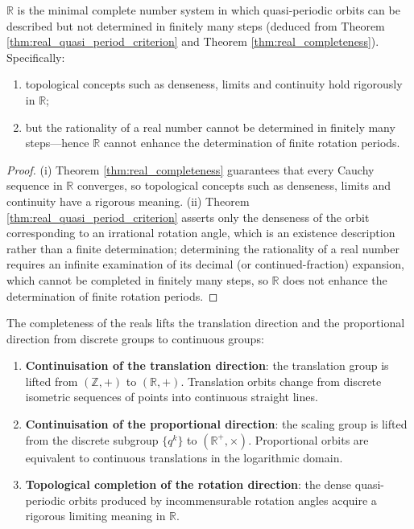 \begin{corollary}\label{cor:real_quasi_period}
$\mathbb{R}$ is the minimal complete number system in which quasi-periodic orbits can be described but not determined in finitely many steps (deduced from Theorem \ref{thm:real_quasi_period_criterion} and Theorem \ref{thm:real_completeness}). Specifically:
\begin{enumerate}[label=(\roman*)]
    \item topological concepts such as denseness, limits and continuity hold rigorously in $\mathbb{R}$;
    \item but the rationality of a real number cannot be determined in finitely many steps---hence $\mathbb{R}$ cannot enhance the determination of finite rotation periods.
\end{enumerate}
\end{corollary}

\begin{proof}
(i) Theorem \ref{thm:real_completeness} guarantees that every Cauchy sequence in $\mathbb{R}$ converges, so topological concepts such as denseness, limits and continuity have a rigorous meaning.
(ii) Theorem \ref{thm:real_quasi_period_criterion} asserts only the denseness of the orbit corresponding to an irrational rotation angle, which is an existence description rather than a finite determination; determining the rationality of a real number requires an infinite examination of its decimal (or continued-fraction) expansion, which cannot be completed in finitely many steps, so $\mathbb{R}$ does not enhance the determination of finite rotation periods.
\end{proof}

\begin{proposition}\label{prop:real_completion_direction}
The completeness of the reals lifts the translation direction and the proportional direction from discrete groups to continuous groups:
\begin{enumerate}[label=(\roman*)]
    \item \textbf{Continuisation of the translation direction}: the translation group is lifted from $(\mathbb{Z},+)$ to $(\mathbb{R},+)$. Translation orbits change from discrete isometric sequences of points into continuous straight lines.
    \item \textbf{Continuisation of the proportional direction}: the scaling group is lifted from the discrete subgroup $\{q^k\}$ to $(\mathbb{R}^+,\times)$. Proportional orbits are equivalent to continuous translations in the logarithmic domain.
    \item \textbf{Topological completion of the rotation direction}: the dense quasi-periodic orbits produced by incommensurable rotation angles acquire a rigorous limiting meaning in $\mathbb{R}$.
\end{enumerate}
\end{proposition}

